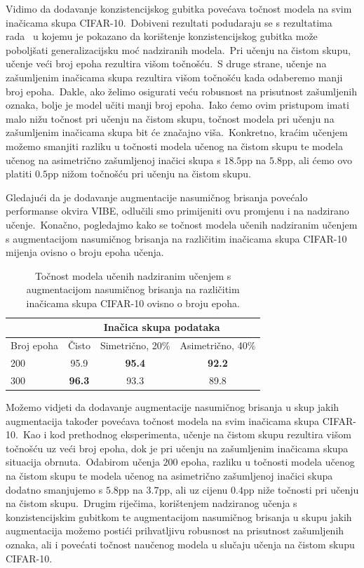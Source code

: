 \documentclass[diplomskirad]{fer}
\begin{document}
Vidimo da dodavanje konzistencijskog gubitka povećava točnost modela na svim inačicama skupa CIFAR-10.\ 
Dobiveni rezultati podudaraju se s rezultatima rada~\cite{grubivsic2023revisiting} u kojemu je pokazano da korištenje konzistencijskog gubitka može poboljšati generalizacijsku moć nadziranih modela.\
Pri učenju na čistom skupu, učenje veći broj epoha rezultira višom točnošću.\ S druge strane, učenje na zašumljenim inačicama skupa rezultira višom točnošću kada odaberemo manji broj epoha.\ 
Dakle, ako želimo osigurati veću robusnost na prisutnost zašumljenih oznaka, bolje je model učiti manji broj epoha.\ 
Iako ćemo ovim pristupom imati malo nižu točnost pri učenju na čistom skupu, točnost modela pri učenju na zašumljenim inačicama skupa bit će značajno viša.\ 
Konkretno, kraćim učenjem možemo smanjiti razliku u točnosti modela učenog na čistom skupu te modela učenog na asimetrično zašumljenoj inačici skupa s $18.5$pp na $5.8$pp, ali ćemo ovo platiti $0.5$pp nižom točnošću pri učenju na čistom skupu.\  

Gledajući da je dodavanje augmentacije nasumičnog brisanja povećalo performanse okvira VIBE, odlučili smo primijeniti ovu promjenu i na nadzirano učenje.\ 
Konačno, pogledajmo kako se točnost modela učenih nadziranim učenjem s augmentacijom nasumičnog brisanja na različitim inačicama skupa CIFAR-10 mijenja ovisno o broju epoha učenja.\ 

\begin{table}[htb]
  \caption{Točnost modela učenih nadziranim učenjem s augmentacijom nasumičnog brisanja na različitim inačicama skupa CIFAR-10 ovisno o broju epoha.}
  \label{tbl:usporedba_nadzirano_con_loss_rand_erase}
  \centering
  \begin{tabular}{l||ccc}
  & \multicolumn{3}{c}{Inačica skupa podataka} \\ \hline
  Broj epoha & Čisto & Simetrično, 20\% & Asimetrično, 40\% \\ \hline \hline
  200 & 95.9 & \textbf{95.4} & \textbf{92.2} \\
  300 & \textbf{96.3} & 93.3 & 89.8 \\
  \end{tabular}
\end{table}

Možemo vidjeti da dodavanje augmentacije nasumičnog brisanja u skup jakih augmentacija također povećava točnost modela na svim inačicama skupa CIFAR-10.\ 
Kao i kod prethodnog eksperimenta, učenje na čistom skupu rezultira višom točnošću uz veći broj epoha, dok je pri učenju na zašumljenim inačicama skupa situacija obrnuta.\ 
Odabirom učenja $200$ epoha, razliku u točnosti modela učenog na čistom skupu te modela učenog na asimetrično zašumljenoj inačici skupa dodatno smanjujemo s $5.8$pp na $3.7$pp, ali uz cijenu $0.4$pp niže točnosti pri učenju na čistom skupu.\ 
Drugim riječima, korištenjem nadziranog učenja s konzistencijskim gubitkom te augmentacijom nasumičnog brisanja u skupu jakih augmentacija možemo postići prihvatljivu robusnost na prisutnost zašumljenih oznaka, ali i povećati točnost naučenog modela u slučaju učenja na čistom skupu CIFAR-10.\ 
\end{document}
